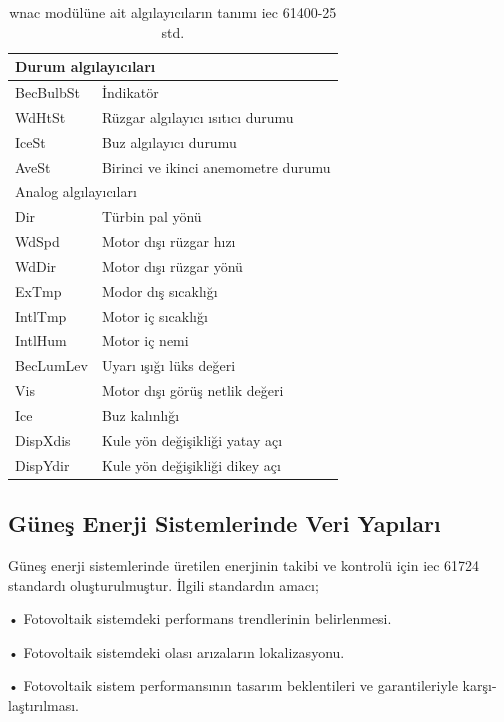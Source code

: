 \begin{table}[htbp]
\centering
\caption{\gls{wnac} modülüne ait algılayıcıların tanımı \gls{iec} 61400-25 std.}
\label{tab:WNACdetay}
\begin{tabular}{ll}
\multicolumn{2}{l}{Durum algılayıcıları}        \\ \hline
BecBulbSt & İndikatör                           \\
WdHtSt    & Rüzgar algılayıcı ısıtıcı durumu    \\
IceSt     & Buz algılayıcı durumu               \\
AveSt     & Birinci ve ikinci anemometre durumu \\
\multicolumn{2}{l}{Analog algılayıcıları}           \\ \hline
Dir       & Türbin pal yönü                     \\
WdSpd     & Motor dışı rüzgar hızı              \\
WdDir     & Motor dışı rüzgar yönü              \\
ExTmp     & Modor dış sıcaklığı                 \\
IntlTmp   & Motor iç sıcaklığı                  \\
IntlHum   & Motor iç nemi                       \\
BecLumLev & Uyarı ışığı lüks değeri             \\
Vis       & Motor dışı görüş netlik değeri      \\
Ice       & Buz kalınlığı                       \\
DispXdis  & Kule yön değişikliği yatay açı      \\
DispYdir  & Kule yön değişikliği dikey açı      \\ \hline
\end{tabular}
\end{table}


\subsection{Güneş Enerji Sistemlerinde Veri Yapıları}
Güneş enerji sistemlerinde üretilen enerjinin takibi ve kontrolü için \gls{iec} 61724 standardı oluşturulmuştur. İlgili standardın amacı;

•	Fotovoltaik sistemdeki performans trendlerinin belirlenmesi.

•	Fotovoltaik sistemdeki olası arızaların lokalizasyonu.

•	Fotovoltaik sistem performansının tasarım beklentileri ve garantileriyle karşı-laştırılması.


